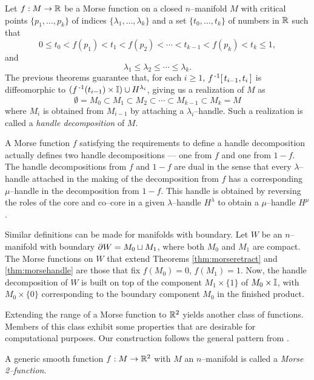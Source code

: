 \begin{defn}
  \label{def:morsehandle}
	Let $f:M\to\mathbb{R}$ be a Morse function on a closed $n$--manifold $M$ with critical points $\{p_1,\dots,p_k\}$ of indices $\{\lambda_1,\dots,\lambda_k\}$ and a set $\{t_0,\dots,t_k\}$ of numbers in $\mathbb{R}$ such that
	\[
		0\leq t_0 < f(p_1) < t_1 < f(p_2) < \cdots < t_{k-1} < f(p_k) < t_k \leq 1,
	\]
	and
	\[
		\lambda_1 \leq \lambda_2 \leq \cdots \leq \lambda_k.
	\]
	The previous theorems guarantee that, for each $i\geq 1$, $f^{\,\text{-}1}[\,t_{i-1},t_i\,]$ is diffeomorphic to $(f^{\,\text{-}1}(t_{i-1})\times\mathbb{I})\cup H^{\lambda_i}$, giving us a realization of $M$ as
	\[
		\emptyset = M_0 \subset M_1 \subset M_2 \subset \cdots \subset M_{k-1} \subset M_k = M
	\]
	where $M_i$ is obtained from $M_{i-1}$ by attaching a $\lambda_i$--handle.
	Such a realization is called a \emph{handle decomposition} of $M$.
\end{defn}

A Morse function $f$ satisfying the requirements to define a handle decomposition actually defines two handle decompositions --- one from $f$ and one from $1-f$.
The handle decompositions from $f$ and $1-f$ are dual in the sense that every $\lambda$--handle attached in the making of the decomposition from $f$ has a corresponding $\mu$--handle in the decomposition from $1-f$.
This handle is obtained by reversing the roles of the core and co--core in a given $\lambda$--handle $H^\lambda$ to obtain a $\mu$--handle $H^\mu$.

Similar definitions can be made for manifolds with boundary.
Let $W$ be an $n$--manifold with boundary $\partial W = M_0\sqcup M_1$, where both $M_0$ and $M_1$ are compact.
The Morse functions on $W$ that extend Theorems \ref{thm:morseretract} and \ref{thm:morsehandle} are those that fix $f(M_0)=0$, $f(M_1)=1$.
Now, the handle decomposition of $W$ is built on top of the component $M_1\times\{1\}$ of $M_0\times\mathbb{I}$, with $M_0\times\{0\}$ corresponding to the boundary component $M_0$ in the finished product.

Extending the range of a Morse function to $\mathbb{R}^2$ yields another class of functions.
Members of this class exhibit some properties that are desirable for computational purposes.
Our construction follows the general pattern from \cite{GayKirby14}.

\begin{defn}
	\label{def:morse2function}
	A generic smooth function $f:M\to\mathbb{R}^2$ with $M$ an $n$--manifold is called a \emph{Morse 2--function}.
\end{defn}

